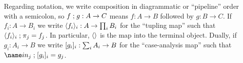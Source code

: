 Regarding notation, we write composition in diagrammatic or ``pipeline'' order
with a semicolon, so $f \mathrel{;} g : A \to C$ means $f : A \to B$ followed by $g
: B \to C$.
%
If $f_i : A \to B_i$ we write $\langle{f_i}\rangle_i : A \to \prod_i B_i$ for the
``tupling map'' such that $\langle{f_i}\rangle_i \mathrel{;} \pi_j = f_j$.
%
In particular, $\langle{}\rangle$ is the map into the terminal object.
%
Dually, if $g_i : A_i \to B$ we write $[{g_i}]_i : \sum_i A_i \to B$ for the
``case-analysis map'' such that $\injc_j \then \krof{g_i}_i = g_j$.

